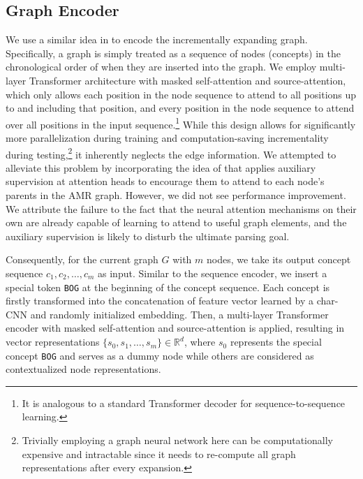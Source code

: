 \documentclass[11pt,a4paper]{article}
\begin{document}
	\subsection{Graph Encoder}
	We use a similar idea in  to encode the incrementally expanding graph. Specifically, a graph is simply treated as a sequence of nodes (concepts) in the chronological order of when they are inserted into the graph. We employ multi-layer Transformer architecture with masked self-attention and source-attention, which only allows each position in the node sequence to attend to all positions up to and including that position, and every position in the node sequence to attend over all positions in the input sequence.\footnote{It is analogous to a standard Transformer decoder \cite{vaswani2017attention} for sequence-to-sequence learning.} While this design allows for significantly more parallelization during training and computation-saving incrementality during testing,\footnote{Trivially employing a graph neural network here can be computationally expensive and intractable since it needs to re-compute all graph representations after every expansion.} it inherently neglects the edge information. We attempted to alleviate this problem by incorporating the idea of  that applies auxiliary supervision at attention heads to encourage them to attend to each node’s parents in the AMR graph. However, we did not see performance improvement. We attribute the failure to the fact that the neural attention mechanisms on their own are already capable of learning to attend to useful graph elements, and the auxiliary supervision is likely to disturb the ultimate parsing goal.
	
	Consequently, for the current graph $G$ with $m$ nodes, we take its output concept sequence $c_1, c_2, \ldots, c_m$ as input. Similar to the sequence encoder, we insert a special token \texttt{BOG} at the beginning of the concept sequence. Each concept is firstly transformed into the concatenation of feature vector learned by a char-CNN and randomly initialized  embedding. Then, a multi-layer Transformer encoder with masked self-attention and source-attention is applied, resulting in vector representations $\{s_0, s_1, \ldots, s_m\}\in\mathbb{R}^d$, where $s_0$ represents the special concept \texttt{BOG} and serves as a dummy node while others are considered as contextualized node representations.
\end{document}
